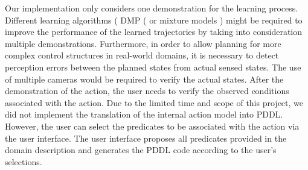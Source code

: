 
Our implementation only considers one demonstration for the learning process.
Different learning algorithms (\eg
DMP (\cite{schaal03} or mixture models \cite{calinon2007learning}) might be required to improve the performance of the learned trajectories by taking into consideration multiple demonstrations.
Furthermore, in order to allow planning for more complex control structures in real-world domains, it is necessary to detect perception errors between the planned states from actual sensed states.
The use of multiple cameras would be required to verify the actual states.
After the demonstration of the action, the user needs to verify the observed conditions associated with the action.
Due to the limited time and scope of this project, we did not implement the translation of the internal action model into PDDL.
However, the user can select the predicates to be associated with the action via the user interface.
The user interface proposes all predicates provided in the domain description and generates the PDDL code according to the user's selections.

